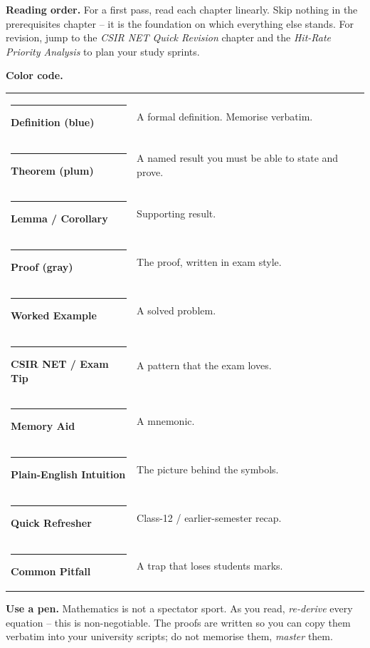\documentclass[11pt,a4paper,openany]{book}
\begin{document}
\textbf{Reading order.} For a first pass, read each chapter linearly.
Skip nothing in the prerequisites chapter -- it is the foundation on
which everything else stands. For revision, jump to the
\emph{CSIR NET Quick Revision} chapter and the \emph{Hit-Rate Priority
Analysis} to plan your study sprints.

\textbf{Color code.}\\[2pt]
\begin{tabular}{@{}p{}p{}@{}}
\textcolor{DefBlue}{\rule{1.2em}{0.7em}}\;\textbf{Definition (blue)} & A formal definition. Memorise verbatim.\\
\textcolor{ThmPlum}{\rule{1.2em}{0.7em}}\;\textbf{Theorem (plum)}    & A named result you must be able to state and prove.\\
\textcolor{LemmaTeal}{\rule{1.2em}{0.7em}}\;\textbf{Lemma / Corollary} & Supporting result.\\
\textcolor{ProofGray}{\rule{1.2em}{0.7em}}\;\textbf{Proof (gray)}    & The proof, written in exam style.\\
\textcolor{ExGreen}{\rule{1.2em}{0.7em}}\;\textbf{Worked Example}    & A solved problem.\\
\textcolor{ExamRed}{\rule{1.2em}{0.7em}}\;\textbf{CSIR NET / Exam Tip} & A pattern that the exam loves.\\
\textcolor{TipAmber}{\rule{1.2em}{0.7em}}\;\textbf{Memory Aid}        & A mnemonic.\\
\textcolor{IntuitTeal}{\rule{1.2em}{0.7em}}\;\textbf{Plain-English Intuition} & The picture behind the symbols.\\
\textcolor{PreReqSand}{\rule{1.2em}{0.7em}}\;\textbf{Quick Refresher} & Class-12 / earlier-semester recap.\\
\textcolor{WarnOrange}{\rule{1.2em}{0.7em}}\;\textbf{Common Pitfall}  & A trap that loses students marks.\\
\end{tabular}

\textbf{Use a pen.} Mathematics is not a spectator sport. As you read,
\emph{re-derive} every equation -- this is non-negotiable. The proofs
are written so you can copy them verbatim into your university scripts;
do not memorise them, \emph{master} them.

\tableofcontents
\mainmatter

\end{document}
